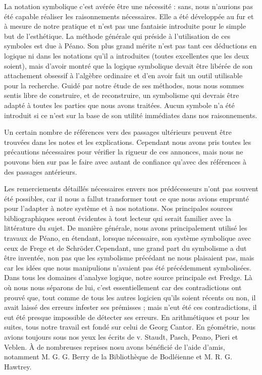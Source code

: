 \documentclass[a4paper]{book}
\newcommand{\marge}[1]{\marginpar{\begin{center}
\begin{minipage}{3.5cm}{#1}\end{minipage}
\end{center}}}
\begin{document}
La notation symbolique c'est avérée être une nécessité : sans, nous n'aurions pas été capable réaliser les raisonnements nécessaires. Elle a été développée au fur et à mesure de notre pratique et n'est pas une fantaisie introduite pour le simple but de l'esthétique. La méthode générale qui préside à l'utilisation de ces symboles est due à Péano. Son plus grand mérite n'est pas tant ces déductions en logique ni dans les notations qu'il a introduites (toutes excellentes que les deux soient), mais d'avoir montré que la logique symbolique devait être libérée de son attachement obsessif à l'algèbre ordinaire et d'en avoir fait un outil utilisable pour la recherche. Guidé par notre étude de ses méthodes, nous nous sommes sentis libre de construire, et de reconstruire, un symbolisme qui devrais être adapté à toutes les parties que nous avons traitées. Aucun symbole n'a été introduit si ce n'est sur la base de son utilité immédiates dans nos raisonnements. 
 
Un certain nombre de références vers des passages ultérieurs peuvent être trouvées dans les notes et les explications. Cependant nous avons pris toutes les précautions nécessaires pour vérifier la rigueur de ces annonces, mais nous ne pouvons bien sur pas le faire avec autant de confiance qu'avec des références à des passages antérieurs. 
 
Les remerciements détaillés nécessaires envers nos prédécesseurs n'ont pas souvent été possibles, car il nous a fallut transformer tout ce que nous avions emprunté pour l'adapter à notre système et à nos notations. Nos principales sources bibliographiques seront évidentes à tout lecteur qui serait familier avec la littérature du sujet. De manière générale, nous avons principalement utilisé les travaux de Péano, en étendant, lorsque nécessaire, son système symbolique avec ceux de Frege et de Schröder.Cependant, une grand part du symbolisme a dut être inventée, non pas que les symbolisme précédant ne nous plaisaient pas, mais car les idées que nous manipulions n'avaient pas été précédemment symbolisées. Dans tous les domaines d'analyse logique, notre source principale est Fredge. Là où nous nous séparons de lui, c'est essentiellement car des contradictions ont prouvé que, tout comme de tous les autres logicien qu'ils soient récents ou non,  il avait laissé des erreurs infester ses prémisses ; mais n'eut été ces contradictions, il eut été presque impossible de détecter ses erreurs. En arithmétiques et pour les suites, tous notre travail est fondé sur celui de Georg Cantor. En géométrie, nous avions toujours sous nos yeux les écrits de v. Staudt, Pasch, Peano, Pieri et Veblen\marge{Il faudrait que je trouve les références de ces ouvrages.}. 
 À de nombreuses reprises nosu avons bénéficié de l'aide d'amis, notamment M. G. G. Berry de la Bibliothèque de Bodléienne et M. R. G. Hawtrey.
 
\end{document}

